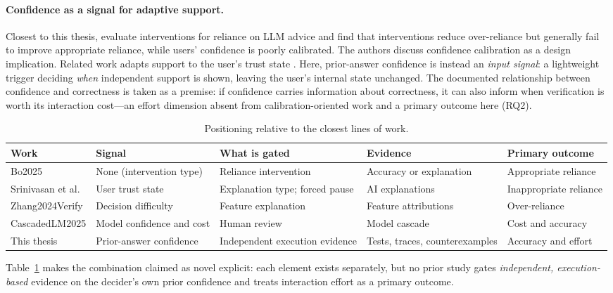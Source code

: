 \documentclass[oneside,final,14pt,a4paper]{extreport}
\begin{document}
\paragraph{Confidence as a signal for adaptive support.}
Closest to this thesis, \cite{Bo2025} evaluate interventions for reliance on
LLM advice and find that interventions reduce over-reliance but generally
fail to improve appropriate reliance, while users' confidence is poorly
calibrated. The authors discuss confidence calibration as a design
implication. Related work adapts support to the user's trust state
\cite{SrinivasanAdjustForTrust}. Here, prior-answer confidence is instead an
\emph{input signal}: a lightweight trigger deciding \emph{when} independent
support is shown, leaving the user's internal state unchanged. The documented
relationship between confidence and correctness is taken as a premise: if
confidence carries information about correctness, it can also inform when
verification is worth its interaction cost---an effort dimension absent from
calibration-oriented work and a primary outcome here (RQ2).

\begin{table}[t]
\centering
\caption{Positioning relative to the closest lines of work.}
\label{tab:positioning}
\footnotesize
\begin{tabular}{@{}>{\raggedright\arraybackslash}p{2.7cm}>{\raggedright\arraybackslash}p{2.3cm}>{\raggedright\arraybackslash}p{2.9cm}>{\raggedright\arraybackslash}p{3.5cm}>{\raggedright\arraybackslash}p{2.7cm}@{}}
\toprule
Work & Signal & What is gated & Evidence & Primary outcome \\
\midrule
Bo2025 & None (intervention type) & Reliance intervention &
Accuracy or explanation & Appropriate reliance \\
Srinivasan et al. & User trust state & Explanation type; forced pause &
AI explanations & Inappropriate reliance \\
Zhang2024Verify & Decision difficulty & Feature explanation &
Feature attributions & Over-reliance \\
CascadedLM2025 & Model confidence and cost & Human review &
Model cascade & Cost and accuracy \\
This thesis & Prior-answer confidence & Independent execution evidence &
Tests, traces, counterexamples & Accuracy and effort \\
\bottomrule
\end{tabular}
\end{table}

Table~\ref{tab:positioning} makes the combination claimed as novel explicit:
each element exists separately, but no prior study gates \emph{independent,
execution-based} evidence on the decider's own prior confidence and treats
interaction effort as a primary outcome.
\end{document}

